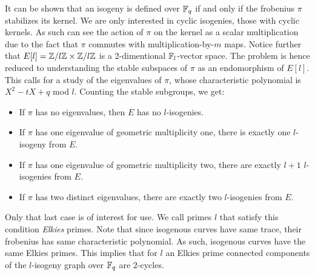 \documentclass[../main/main.tex]{subfiles}
\begin{document}
It can be shown that an isogeny is defined over $\mathbb{F}_q$ if and only if the frobenius $\pi$ stabilizes its kernel.
We are only interested in cyclic isogenies, those with cyclic kernels.
As such can see the action of $\pi$ on the kernel as a scalar multiplication due to the fact that $\pi$ commutes with multiplication-by-$m$ maps.
Notice further that $E[l] = \mathbb{Z}/l\mathbb{Z}\times\mathbb{Z}/l\mathbb{Z}$ is a 2-dimentional $\mathbb{F}_l$-vector space.
The problem is hence reduced to understanding the stable subspaces of $\pi$ as an endomorphism of $E[l]$.
This calls for a study of the eigenvalues of $\pi$, whose characteristic polynomial is $X^2-tX+q$ mod $l$.
Counting the stable subgroups, we get:
\begin{itemize}
	  \item If $\pi$ has no eigenvalues, then $E$ has no $l$-isogenies.
	  \item If $\pi$ has one eigenvalue of geometric multiplicity one, there is exactly one $l$-isogeny from $E$.
	  \item If $\pi$ has one eigenvalue of geometric multiplicity two, there are exactly $l+1$ $l$-isogenies from $E$.
	  \item If $\pi$ has two distinct eigenvalues, there are exactly two $l$-isogenies from $E$.
\end{itemize}
Only that last case is of interest for use.
We call primes $l$ that satisfy this condition \textit{Elkies} primes.
Note that since isogenous curves have same trace, their frobenius has same characteristic polynomial.
As such, isogenous curves have the same Elkies primes.
This implies that for $l$ an Elkies prime connected components of the $l$-isogeny graph over $\mathbb{F}_q$ are $2$-cycles.
\end{document}
